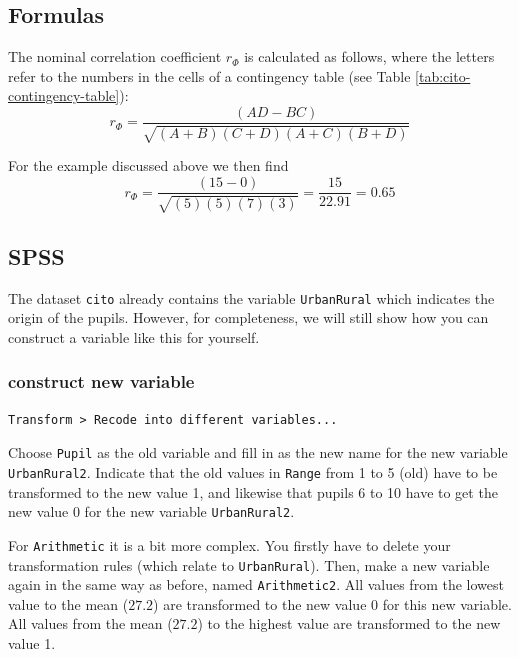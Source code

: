 \documentclass[
]{book}
\begin{document}
\hypertarget{formulas-5}{%
\subsection{Formulas}\label{formulas-5}}

The nominal correlation coefficient \(r_\Phi\) is calculated as follows,
where the letters refer to the numbers in the cells of a contingency table
(see Table \ref{tab:cito-contingency-table}):
\begin{equation}
    r_\Phi = \frac{(AD-BC)}{\sqrt{(A+B)(C+D)(A+C)(B+D)}}
  \label{eq:phi}
\end{equation}

For the example discussed above we then find
\[
    r_\Phi = \frac{(15-0)}{\sqrt{(5)(5)(7)(3)}} = \frac{15}{22.91} = 0.65
\]

\hypertarget{spss-8}{%
\subsection{SPSS}\label{spss-8}}

The dataset \texttt{cito} already contains the variable \texttt{UrbanRural} which indicates the
origin of the pupils. However, for completeness, we will still show how you can
construct a variable like this for yourself.

\hypertarget{construct-new-variable}{%
\subsubsection{construct new variable}\label{construct-new-variable}}

\begin{verbatim}
Transform > Recode into different variables...
\end{verbatim}

Choose \texttt{Pupil} as the old variable and fill in as the new name for the new variable
\texttt{UrbanRural2}. Indicate that the old values in \texttt{Range} from
1 to 5 (old) have to be transformed to the new value 1, and likewise that
pupils 6 to 10 have to get the new value 0 for the new variable
\texttt{UrbanRural2}.

For \texttt{Arithmetic} it is a bit more complex. You firstly have to delete
your transformation rules (which relate to \texttt{UrbanRural}). Then, make a new variable
again in the same way as before, named \texttt{Arithmetic2}.
All values from the lowest value to the mean (\(27.2\)) are transformed to the
new value 0 for this new variable. All values
from the mean (\(27.2\)) to the highest value are transformed to the new value 1.
\end{document}
